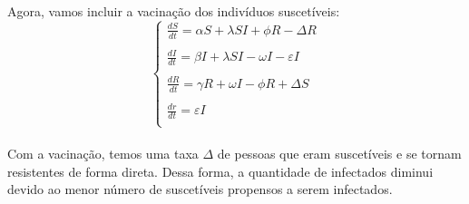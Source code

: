 \documentclass[a4paper]{article}
\begin{document}
\begin{enumerate}
\begin{itemize}
\end{itemize}
\\
Agora, vamos incluir a vacina\c{c}\~ao dos indiv\'iduos suscet\'iveis:
\\
\begin{equation}
\left\{\begin{array}{l}
\frac{dS}{dt} = \alpha S + \lambda SI + \phi R - \Delta R\\
\\
\frac{dI}{dt} = \beta I + \lambda SI - \omega I - \varepsilon I\\
\\
\frac{dR}{dt} = \gamma R + \omega I - \phi R + \Delta S\\
\\
\frac{dr}{dt} = \varepsilon I \\
\end{array}
\end{equation}
\\
Com a vacina\c{c}\~ao, temos uma taxa $\Delta$ de pessoas que eram suscet\'iveis e se tornam resistentes de forma direta. Dessa forma, a quantidade de infectados diminui devido ao menor n\'umero de suscet\'iveis propensos a serem infectados.
\\


\end{enumerate}
\end{document}

